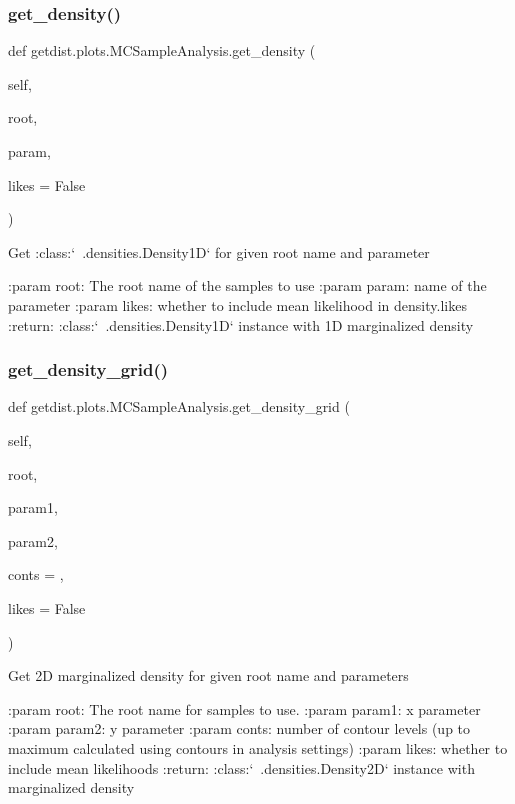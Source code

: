 \subsubsection{\texorpdfstring{get\+\_\+density()}{get\_density()}}
{\footnotesize\ttfamily def getdist.\+plots.\+M\+C\+Sample\+Analysis.\+get\+\_\+density (\begin{DoxyParamCaption}\item[{}]{self,  }\item[{}]{root,  }\item[{}]{param,  }\item[{}]{likes = {\ttfamily False} }\end{DoxyParamCaption})}

\begin{DoxyVerb}Get :class:`~.densities.Density1D` for given root name and parameter

:param root:  The root name of the samples to use
:param param: name of the parameter
:param likes: whether to include mean likelihood in density.likes
:return:  :class:`~.densities.Density1D` instance with 1D marginalized density
\end{DoxyVerb}
 \mbox{\label{classgetdist_1_1plots_1_1MCSampleAnalysis_a03533aa69a7cfeddba8e641b36b6025d}} 
\subsubsection{\texorpdfstring{get\+\_\+density\+\_\+grid()}{get\_density\_grid()}}
{\footnotesize\ttfamily def getdist.\+plots.\+M\+C\+Sample\+Analysis.\+get\+\_\+density\+\_\+grid (\begin{DoxyParamCaption}\item[{}]{self,  }\item[{}]{root,  }\item[{}]{param1,  }\item[{}]{param2,  }\item[{}]{conts = {},  }\item[{}]{likes = {\ttfamily False} }\end{DoxyParamCaption})}

\begin{DoxyVerb}Get 2D marginalized density for given root name and parameters

:param root: The root name for samples to use.
:param param1: x parameter
:param param2: y parameter
:param conts: number of contour levels (up to maximum calculated using contours in analysis settings)
:param likes: whether to include mean likelihoods
:return: :class:`~.densities.Density2D` instance with marginalized density
\end{DoxyVerb}
 

